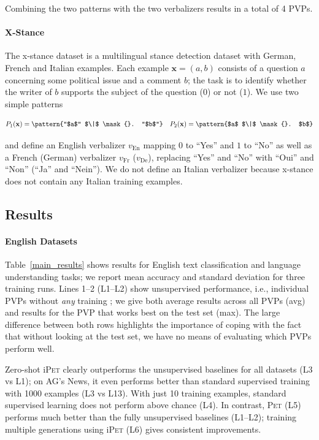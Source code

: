 Combining the two patterns with the two verbalizers results in a total of 4 PVPs.

\paragraph{X-Stance}

The x-stance dataset \citep{vamvas2020xstance} is a multilingual stance detection dataset with German, French and Italian examples. Each example $\mathbf{x} = (a,b)$ consists of a question $a$ concerning some political issue and a comment $b$; the task is to identify whether the writer of $b$ supports the subject of the question ($0$) or not ($1$). We use two simple patterns

\begin{align*}
P_1(\mathbf{x}) = \pattern{``$a$'' $\|$ \mask{}. ``$b$''} && P_2(\mathbf{x}) = \pattern{$a$ $\|$ \mask{}. $b$}
\end{align*}

and define an English verbalizer $v_\text{En}$ mapping $0$ to ``Yes'' and $1$ to ``No'' as well as a French (German) verbalizer $v_\text{Fr}$ ($v_\text{De}$), replacing ``Yes'' and ``No'' with ``Oui'' and ``Non'' (``Ja'' and ``Nein''). We do not define an Italian verbalizer because x-stance does not contain any Italian training examples.

\subsection{Results}

\paragraph{English Datasets} Table~\ref{main_results} shows results for English text classification and language understanding tasks; we report mean accuracy and standard deviation for three training runs. Lines 1--2 (L1--L2) show unsupervised performance, i.e., individual PVPs without \emph{any} training \citep[similar to][]{radford2018improving,puri2019zeroshot}; we give both average results across all PVPs (avg) and results for the PVP that works best on the test set (max). The large difference between both rows highlights the importance of coping with the fact that without looking at the test set, we have no means of evaluating which PVPs perform well.

Zero-shot i\textsc{Pet}
clearly outperforms the unsupervised baselines for all datasets (L3 vs L1); on AG's News, it even performs better than standard supervised training with 1000 examples (L3 vs L13). With just 10 training examples, standard supervised learning does not perform above chance (L4). In contrast, \textsc{Pet} (L5) performs much better than the fully unsupervised baselines (L1--L2); training multiple generations using
i\textsc{Pet} (L6) gives consistent improvements. 


